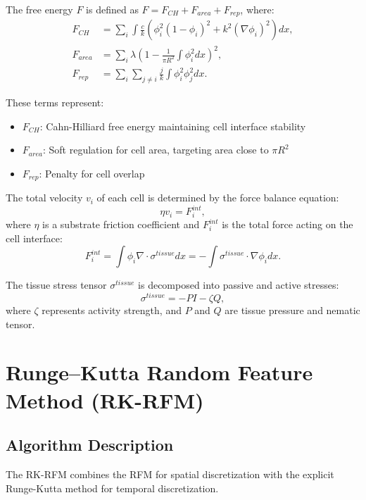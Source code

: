 \documentclass[11pt]{article}
\begin{document}
The free energy $F$ is defined as $F = F_{CH} + F_{area} + F_{rep}$, where:
\begin{align}
    F_{CH} &= \sum_i \int \frac{c}{k}(\phi_i^2(1-\phi_i)^2 + k^2(\nabla\phi_i)^2) dx, \\
    F_{area} &= \sum_i \lambda\left(1-\frac{1}{\pi R^2}\int\phi_i^2 dx\right)^2, \\
    F_{rep} &= \sum_i \sum_{j\neq i}\frac{j}{k}\int\phi_i^2\phi_j^2 dx.
\end{align}

These terms represent:
\begin{itemize}
    \item $F_{CH}$: Cahn-Hilliard free energy maintaining cell interface stability
    \item $F_{area}$: Soft regulation for cell area, targeting area close to $\pi R^2$
    \item $F_{rep}$: Penalty for cell overlap
\end{itemize}

The total velocity $v_i$ of each cell is determined by the force balance equation:
\begin{equation}
    \eta v_i = F^{int}_i,
\end{equation}
where $\eta$ is a substrate friction coefficient and $F^{int}_i$ is the total force acting on the cell interface:
\begin{equation}
    F^{int}_i = \int \phi_i \nabla \cdot \sigma^{tissue} dx = -\int \sigma^{tissue} \cdot \nabla\phi_i dx.
\end{equation}

The tissue stress tensor $\sigma^{tissue}$ is decomposed into passive and active stresses:
\begin{equation}
    \sigma^{tissue} = -PI - \zeta Q,
\end{equation}
where $\zeta$ represents activity strength, and $P$ and $Q$ are tissue pressure and nematic tensor.

\section{Runge--Kutta Random Feature Method (RK-RFM)}

\subsection{Algorithm Description}

The RK-RFM combines the RFM for spatial discretization with the explicit Runge-Kutta method for temporal discretization. 
\end{document}
